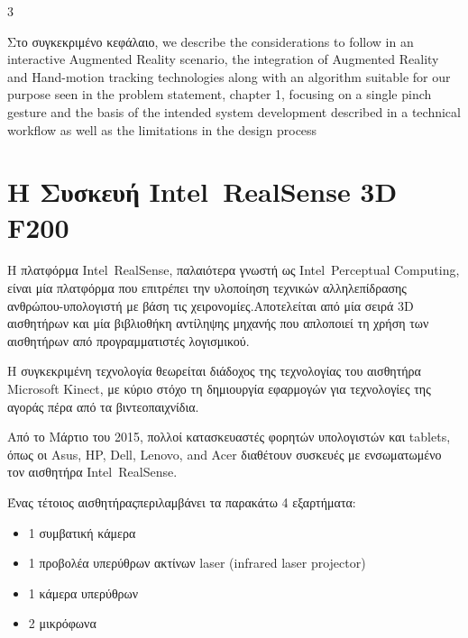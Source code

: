 3%


 \label{c:crypto}
Στο συγκεκριμένο κεφάλαιο,  we describe the considerations to follow in an interactive Augmented Reality scenario, the integration of Augmented Reality and Hand-motion tracking technologies along with an algorithm suitable for our purpose seen in the problem statement, chapter 1, focusing on
a single pinch gesture and the basis of the intended system development described in a technical
workflow as well as the limitations in the design process



\section{Η Συσκευή Intel\textregistered\ RealSense\texttrademark{} 3D F200 }


Η πλατφόρμα Intel\textregistered\ RealSense\texttrademark{}, παλαιότερα γνωστή ως Intel\textregistered\ Perceptual Computing, είναι μία πλατφόρμα που επιτρέπει την υλοποίηση τεχνικών αλληλεπίδρασης ανθρώπου-υπολογιστή με βάση τις χειρονομίες.Αποτελείται από μία σειρά 3D αισθητήρων και μία βιβλιοθήκη αντίληψης μηχανής που απλοποιεί τη χρήση των αισθητήρων από προγραμματιστές λογισμικού. \cite{RealsenseCamera}

Η συγκεκριμένη τεχνολογία θεωρείται διάδοχος της τεχνολογίας του αισθητήρα Microsoft Kinect, με κύριο στόχο τη δημιουργία εφαρμογών για τεχνολογίες της αγοράς πέρα από τα βιντεοπαιχνίδια.

Από το Μάρτιο του 2015, πολλοί κατασκευαστές φορητών υπολογιστών και tablets\cite{Realsenselaptops}, όπως οι Asus, HP, Dell, Lenovo, and Acer διαθέτουν συσκευές με ενσωματωμένο τον αισθητήρα Intel\textregistered\ RealSense\texttrademark{}. 

Ένας τέτοιος αισθητήραςπεριλαμβάνει τα παρακάτω 4 εξαρτήματα: 


\begin{itemize}
  \item 1 συμβατική κάμερα
  \item 1 προβολέα υπερύθρων ακτίνων laser (infrared laser projector)
  \item 1 κάμερα υπερύθρων
  \item 2 μικρόφωνα
\end{itemize}



